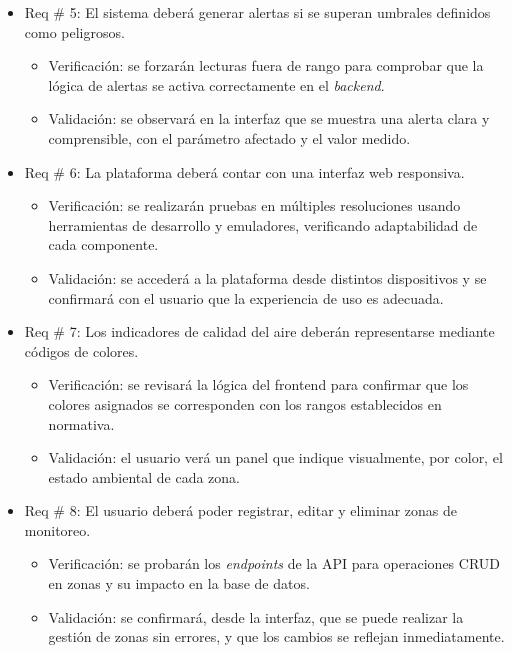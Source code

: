 \documentclass[
11pt, %
]{charter}
\begin{document}
\begin{itemize}
	\item Req \# 5: El sistema deberá generar alertas si se superan umbrales definidos como peligrosos.
	\begin{itemize}
		\item Verificación: se forzarán lecturas fuera de rango para comprobar que la lógica de alertas se activa correctamente en el \textit{backend}.
		\item Validación: se observará en la interfaz que se muestra una alerta clara y comprensible, con el parámetro afectado y el valor medido.
	\end{itemize}
	
	\item Req \# 6: La plataforma deberá contar con una interfaz web responsiva.
	\begin{itemize}
		\item Verificación: se realizarán pruebas en múltiples resoluciones usando herramientas de desarrollo y emuladores, verificando adaptabilidad de cada componente.
		\item Validación: se accederá a la plataforma desde distintos dispositivos y se confirmará con el usuario que la experiencia de uso es adecuada.
	\end{itemize}
	
	\item Req \# 7: Los indicadores de calidad del aire deberán representarse mediante códigos de colores.
	\begin{itemize}
		\item Verificación: se revisará la lógica del frontend para confirmar que los colores asignados se corresponden con los rangos establecidos en normativa.
		\item Validación: el usuario verá un panel que indique visualmente, por color, el estado ambiental de cada zona.
	\end{itemize}
	
	\item Req \# 8: El usuario deberá poder registrar, editar y eliminar zonas de monitoreo.
	\begin{itemize}
		\item Verificación: se probarán los \textit{endpoints} de la API para operaciones CRUD en zonas y su impacto en la base de datos.
		\item Validación: se confirmará, desde la interfaz, que se puede realizar la gestión de zonas sin errores, y que los cambios se reflejan inmediatamente.
	\end{itemize}
	

\end{itemize}
\end{document}
